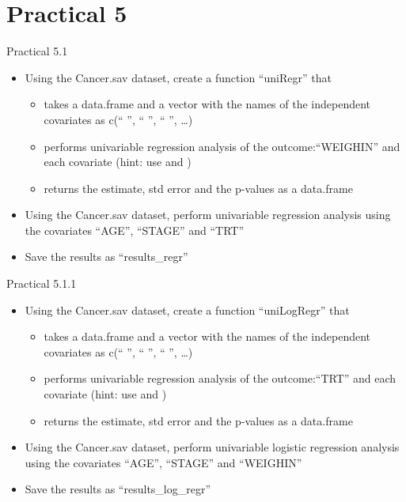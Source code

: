 \documentclass[14pt, aspectratio=169, sectionpage=simple, xclolor=table]{beamer}
\begin{document}
\section{Practical 5}
\begin{frame}{Practical 5.1}
\begin{itemize}
\item Using the Cancer.sav dataset, create a function \enquote{uniRegr} that
\begin{itemize}
\item takes a data.frame and a vector with the names of the independent covariates as c(\enquote{ }, \enquote{ }, \enquote{ }, \dots)
\item performs univariable regression analysis of the outcome:\enquote{WEIGHIN} and each covariate (hint: use  and )
\item returns the estimate, std error and the p-values as a data.frame
\end{itemize}
\item Using the Cancer.sav dataset, perform univariable regression analysis using the covariates \enquote{AGE}, \enquote{STAGE} and \enquote{TRT}
\item Save the results as \enquote{results\_regr}
\end{itemize}
\end{frame}
\begin{frame}{Practical 5.1.1 }
\begin{itemize}
\item Using the Cancer.sav dataset, create a function \enquote{uniLogRegr} that
\begin{itemize}
\item takes a data.frame and a vector with the names of the independent covariates as c(\enquote{ }, \enquote{ }, \enquote{ }, \dots)
\item performs univariable  regression analysis of the outcome:\enquote{TRT} and each covariate (hint: use  and )
\item returns the estimate, std error and the p-values as a data.frame
\end{itemize}
\item Using the Cancer.sav dataset, perform univariable logistic regression analysis using the covariates \enquote{AGE}, \enquote{STAGE} and \enquote{WEIGHIN}
\item Save the results as \enquote{results\_log\_regr}
\end{itemize}
\end{frame}


\label{einde document}
\end{document}
